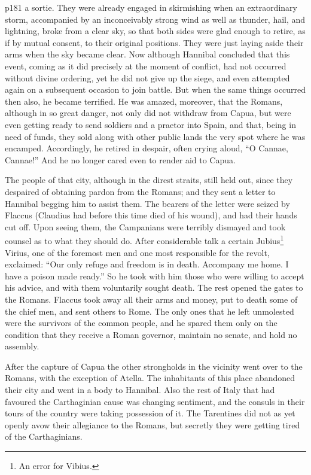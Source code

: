 p181 a sortie. They were already engaged in skirmishing when an extraordinary storm, accompanied by an inconceivably strong wind as well as thunder, hail, and lightning, broke from a clear sky, so that both sides were glad enough to retire, as if by mutual consent, to their original positions. They were just laying aside their arms when the sky became clear. Now although Hannibal concluded that this event, coming as it did precisely at the moment of conflict, had not occurred without divine ordering, yet he did not give up the siege, and even attempted again on a subsequent occasion to join battle. But when the same things occurred then also, he became terrified. He was amazed, moreover, that the Romans, although in so great danger, not only did not withdraw from Capua, but were even getting ready to send soldiers and a praetor into Spain, and that, being in need of funds, they sold along with other public lands the very spot where he was encamped. Accordingly, he retired in despair, often crying aloud, ``O Cannae, Cannae!'' And he no longer cared even to render aid to Capua.

The people of that city, although in the direst straits, still held out, since they despaired of obtaining pardon from the Romans; and they sent a letter to Hannibal begging him to assist them. The bearers of the letter were seized by Flaccus (Claudius had before this time died of his wound), and had their hands cut off. Upon seeing them, the Campanians were terribly dismayed and took counsel as to what they should do. After considerable talk a certain Jubius\texthebrew{⁠}\footnote{An error for Vibius.} Virius, one of the foremost men and one most responsible for the revolt, exclaimed: ``Our only refuge and freedom is in death. Accompany me home. I have a poison made ready.'' So he took with him those who were willing to accept his advice, and with them voluntarily sought death. The rest opened the gates to the Romans. Flaccus took away all their arms and money, put to death some of the chief men, and sent others to Rome. The only ones that he left unmolested were the survivors of the common people, and he spared them only on the condition that they receive a Roman governor, maintain no senate, and hold no assembly.

After the capture of Capua the other strongholds in the vicinity went over to the Romans, with the exception of Atella. The inhabitants of this place abandoned their city and went in a body to Hannibal. Also the rest of Italy that had favoured the Carthaginian cause was changing sentiment, and the consuls in their tours of the country were taking possession of it. The Tarentines did not as yet openly avow their allegiance to the Romans, but secretly they were getting tired of the Carthaginians.

